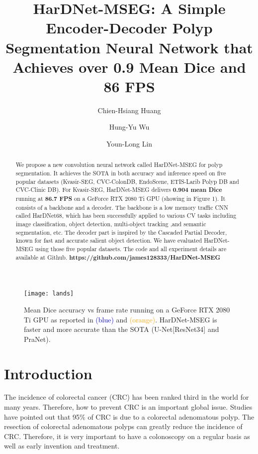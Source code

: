 \documentclass{article}
\title{\bfseries{HarDNet-MSEG: A Simple Encoder-Decoder Polyp Segmentation Neural Network that Achieves over 0.9 Mean Dice and 86 FPS}}
\author[ ]{Chien-Hsiang Huang}
\author[ ]{Hung-Yu Wu}
\author[ ]{Youn-Long Lin}
\affil[ ]{Department of Computer Science, National Tsing Hua University}
\affil[ ]{\small{\{james128333, a9778875\}@gmail.com}, \ \ ylin@cs.nthu.edu.tw}
\date{}
\begin{document}
\maketitle

\begin{center}
    \begin{figure}[htbp]
    \centering
    \texttt{[image: lands]}
    \caption{Mean Dice accuracy vs frame rate running on a GeForce RTX 2080 Ti GPU as reported in \textcolor{blue}{\cite{jha2020real}(blue)} and \textcolor{orange}{\cite{pranet}(orange)}. HarDNet-MSEG is faster and more accurate than the SOTA (U-Net[ResNet34] and PraNet).}
    \label{fig:landscapes}
    \end{figure}
\end{center}

\begin{abstract}
We propose a new convolution neural network called HarDNet-MSEG for polyp segmentation. 
    It achieves the SOTA in both accuracy and inference speed on five popular  datasets (Kvasir-SEG\cite{jha2020kvasir}, CVC-ColonDB\cite{auto2},  EndoScene\cite{vazquez2017benchmark}, ETIS-Larib Polyp DB\cite{silva2014toward} and CVC-Clinic DB\cite{bernal2015wm}). 
    For Kvasir-SEG, HarDNet-MSEG delivers \textbf{0.904 mean Dice} running at \textbf{86.7 FPS} on a GeForce RTX 2080 Ti GPU (showing in Figure 1).
    It consists of a backbone and a decoder. 
    The backbone is a low memory traffic CNN called HarDNet68\cite{chao2019hardnet}, which has been successfully applied to various CV tasks including image classification, object detection, multi-object tracking ,and semantic segmentation, etc. 
    The decoder part is inspired by the Cascaded Partial Decoder\cite{wu2019cascaded}, known for fast and accurate salient object detection. We have evaluated HarDNet-MSEG using those five popular datasets. The code and all experiment details are available at Github. {{\color[HTML]{FE0000} \footnotesize{\textbf{https://github.com/james128333/HarDNet-MSEG}}}}
\end{abstract}
    
\section{Introduction}
    \hspace*{0.5cm}
    The incidence of colorectal cancer (CRC) has been ranked third in the world for many years. 
    Therefore, how to prevent CRC is an important global issue. Studies have pointed out that 95\% of CRC is due to a colorectal adenomatous polyp. 
    The resection of colorectal adenomatous polyps can greatly reduce the incidence of CRC. 
    Therefore, it is very important to have a colonoscopy on a regular basis as well as early invention and treatment.
    
\end{document}
